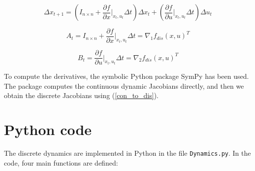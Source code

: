 \begin{equation} \label{con_to_dis}
        \Delta x_{t+1} = (I_{n\times n} + \frac{\partial f}{\partial x}\bigg|_{x_t,u_t} \Delta t) \Delta x_t + 
        (\frac{\partial f}{\partial u}\bigg|_{x_t,u_t} \Delta t) \Delta u_t
\end{equation}

\begin{equation*}
    A_t = I_{n\times n} + \frac{\partial f}{\partial x}\bigg|_{x_t,u_t} \Delta t = \nabla_1f_{dis}(x,u)^T
\end{equation*}

\begin{equation*}
    B_t = \frac{\partial f}{\partial u}\bigg|_{x_t,u_t} \Delta t = \nabla_2f_{dis}(x,u)^T
\end{equation*}

To compute the derivatives, the symbolic Python package SymPy has been used. The package computes the continuous dynamic Jacobians directly, and then we obtain the discrete Jacobians using (\ref{con_to_dis}).

\section*{Python code}

The discrete dynamics are implemented in Python in the file \texttt{Dynamics.py}. In the code, four main functions are defined:

